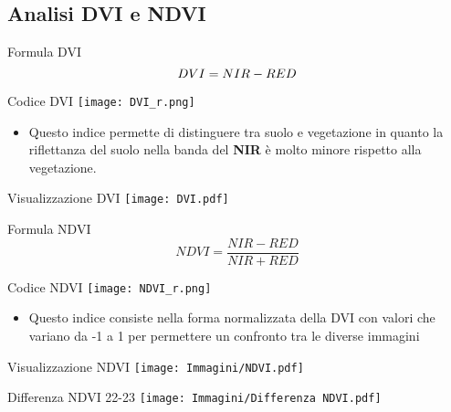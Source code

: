 \documentclass{beamer}
\begin{document}
\subsection{Analisi DVI e NDVI}


\begin{frame}{Formula DVI}
\begin{equation}
    DVI = NIR - RED
    \centering
    \end{equation}
\end{frame}

\begin{frame}{Codice DVI}
\texttt{[image: DVI\_r.png]}
    \begin{itemize}
\item Questo indice permette di distinguere tra suolo e vegetazione in quanto la riflettanza del suolo nella banda del \textbf{NIR} è molto minore rispetto alla vegetazione.
\end{itemize}    
\end{frame}

\begin{frame}{Visualizzazione DVI}
    \texttt{[image: DVI.pdf]}
\end{frame}


\begin{frame}{Formula NDVI}
\begin{equation}
    NDVI = \frac{NIR - RED}{NIR + RED} 
\end{equation}
\end{frame}

\begin{frame}{Codice NDVI}
\texttt{[image: NDVI\_r.png]}
\centering
    \begin{itemize}
\item Questo indice consiste nella forma normalizzata della DVI con valori che variano da -1 a 1 per permettere un confronto tra le diverse immagini
\end{itemize}   
    \end{frame}

\begin{frame}{Visualizzazione NDVI}
    \texttt{[image: Immagini/NDVI.pdf]}
\end{frame}

\begin{frame}{Differenza NDVI 22-23}
\texttt{[image: Immagini/Differenza NDVI.pdf]}
\centering
    \end{frame}
\end{document}
